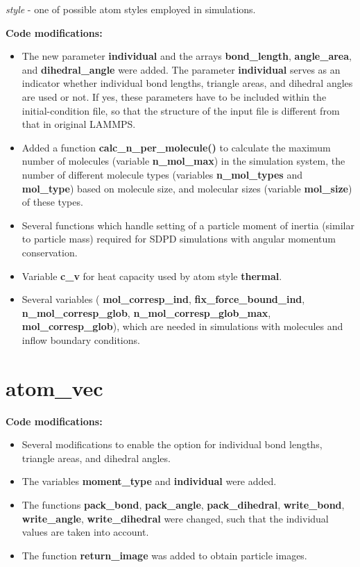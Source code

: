 \textit{style} - one of possible atom styles employed in simulations.
\vspace{0.2cm}

{\bfseries Code modifications:}
\begin{itemize}
\item The new parameter \textbf{individual} and the arrays \textbf{bond\_length}, \textbf{angle\_area}, and \textbf{dihedral\_angle} were added.
  The parameter \textbf{individual} serves as an indicator whether individual bond lengths, triangle areas, and dihedral angles are used or not.
  If yes, these parameters have to be included within the initial-condition file, so that the structure of the input file is different from that
  in original LAMMPS. 
\item Added a function \textbf{calc\_n\_per\_molecule()} to calculate the maximum number of molecules (variable \textbf{n\_mol\_max}) in the simulation system,
  the number of different molecule types (variables \textbf{n\_mol\_types} and \textbf{mol\_type}) based on molecule size, and molecular sizes (variable \textbf{mol\_size})
  of these types. 
\item Several functions which handle setting of a particle moment of inertia (similar to particle mass) required for SDPD simulations with angular momentum conservation. 
\item Variable  \textbf{c\_v} for heat capacity used by atom style \textbf{thermal}.
\item Several variables (\textbf{ mol\_corresp\_ind}, \textbf{fix\_force\_bound\_ind}, \textbf{n\_mol\_corresp\_glob}, \textbf{n\_mol\_corresp\_glob\_max},
  \textbf{mol\_corresp\_glob}), which are needed in simulations with molecules and inflow boundary conditions.  
\end{itemize}
  
\section{atom\_vec}

{\bfseries Code modifications:}
\begin{itemize}
\item Several modifications to enable the option for individual bond lengths, triangle areas, and dihedral angles.
\item The variables \textbf{moment\_type} and \textbf{individual} were added.
\item The functions \textbf{pack\_bond}, \textbf{pack\_angle}, \textbf{pack\_dihedral}, \textbf{write\_bond}, \textbf{write\_angle}, \textbf{write\_dihedral} were
  changed, such that the individual values are taken into account.
\item The function \textbf{return\_image} was added to obtain particle images.
\end{itemize}
  
